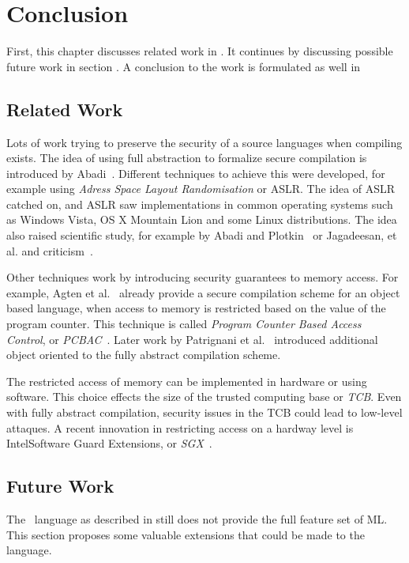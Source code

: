 \chapter{Conclusion}
First, this chapter discusses related work in .
It continues by discussing possible future work in section .
A conclusion to the work is formulated as well in 

\section{Related Work}
\label{sec:relatedwork}
Lots of work trying to preserve the security of a source languages when compiling exists.
The idea of using full abstraction to formalize secure compilation is introduced by Abadi~\cite{Abadi}.
Different techniques to achieve this were developed, for example using \emph{Adress Space Layout Randomisation} or ASLR.%
The idea of ASLR catched on, and ASLR saw implementations in common operating systems such as Windows Vista, OS X Mountain Lion and some Linux distributions. 
The idea also raised scientific study, for example by Abadi and Plotkin~\cite{AbadiASLR} or Jagadeesan, et al.\cite{Jagadeesan} and criticism~\cite{Shacham:2004:EAR:1030083.1030124,Strackx:2009:BMS:1519144.1519145}.

Other techniques work by introducing security guarantees to memory access.
For example, Agten et al.~\cite{Agten:2012:SCM:2354412.2355247} already provide a secure compilation scheme for an object based language, when access to memory is restricted based on the value of the program counter. This technique is called \emph{Program Counter Based Access Control}, or \emph{PCBAC}~\cite{PCBAC}.
Later work by Patrignani et al.~\cite{Patrignani} introduced additional object oriented to the fully abstract compilation scheme.

The restricted access of memory can be implemented in hardware\cite{Sancus,SGX} or using software\cite{Fides,Salus}.
This choice effects the size of the trusted computing base or \emph{TCB}.
Even with fully abstract compilation, security issues in the TCB could lead to low-level attaques.
A recent innovation in restricting access on a hardway level is Intel\textregistered Software Guard Extensions, or \emph{SGX}~\cite{SGX}.

\section{Future Work}
\label{sec:FutureWork}
The \MiniML\ language as described in  still does not provide the full feature set of ML. This section proposes some valuable extensions that could be made to the language.

